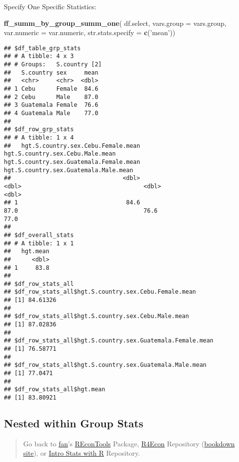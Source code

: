 \documentclass[
]{book}
\newenvironment{Shaded}{\begin{snugshade}}{\end{snugshade}}
\newcommand{\DataTypeTok}[1]{\textcolor[rgb]{0.13,0.29,0.53}{#1}}
\newcommand{\KeywordTok}[1]{\textcolor[rgb]{0.13,0.29,0.53}{\textbf{#1}}}
\newcommand{\NormalTok}[1]{#1}
\newcommand{\StringTok}[1]{\textcolor[rgb]{0.31,0.60,0.02}{#1}}
\begin{document}
Specify One Specific Statistics:

\begin{Shaded}
\begin{Highlighting}[]
\KeywordTok{ff_summ_by_group_summ_one}\NormalTok{(}
\NormalTok{  df.select, }\DataTypeTok{vars.group =}\NormalTok{ vars.group, }\DataTypeTok{var.numeric =}\NormalTok{ var.numeric, }\DataTypeTok{str.stats.specify =} \KeywordTok{c}\NormalTok{(}\StringTok{'mean'}\NormalTok{))}
\end{Highlighting}
\end{Shaded}

\begin{verbatim}
## $df_table_grp_stats
## # A tibble: 4 x 3
## # Groups:   S.country [2]
##   S.country sex     mean
##   <chr>     <chr>  <dbl>
## 1 Cebu      Female  84.6
## 2 Cebu      Male    87.0
## 3 Guatemala Female  76.6
## 4 Guatemala Male    77.0
## 
## $df_row_grp_stats
## # A tibble: 1 x 4
##   hgt.S.country.sex.Cebu.Female.mean hgt.S.country.sex.Cebu.Male.mean hgt.S.country.sex.Guatemala.Female.mean hgt.S.country.sex.Guatemala.Male.mean
##                                <dbl>                            <dbl>                                   <dbl>                                 <dbl>
## 1                               84.6                             87.0                                    76.6                                  77.0
## 
## $df_overall_stats
## # A tibble: 1 x 1
##   hgt.mean
##      <dbl>
## 1     83.8
## 
## $df_row_stats_all
## $df_row_stats_all$hgt.S.country.sex.Cebu.Female.mean
## [1] 84.61326
## 
## $df_row_stats_all$hgt.S.country.sex.Cebu.Male.mean
## [1] 87.02836
## 
## $df_row_stats_all$hgt.S.country.sex.Guatemala.Female.mean
## [1] 76.58771
## 
## $df_row_stats_all$hgt.S.country.sex.Guatemala.Male.mean
## [1] 77.0471
## 
## $df_row_stats_all$hgt.mean
## [1] 83.80921
\end{verbatim}

\hypertarget{nested-within-group-stats}{%
\subsection{Nested within Group Stats}\label{nested-within-group-stats}}

\begin{quote}
Go back to \href{http://fanwangecon.github.io/CodeDynaAsset/}{fan}'s \href{https://fanwangecon.github.io/REconTools/}{REconTools} Package, \href{https://fanwangecon.github.io/R4Econ/}{R4Econ} Repository (\href{https://fanwangecon.github.io/R4Econ/bookdown}{bookdown site}), or \href{https://fanwangecon.github.io/Stat4Econ/}{Intro Stats with R} Repository.
\end{quote}
\end{document}
